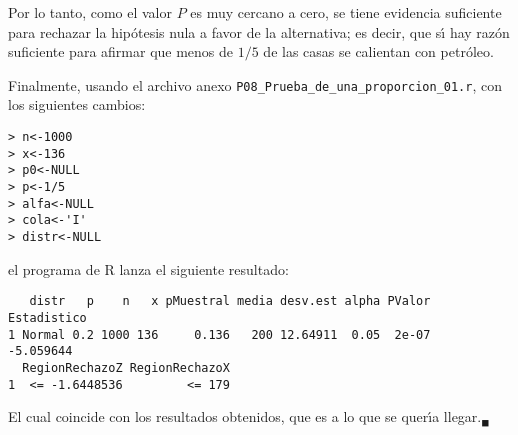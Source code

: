 \begin{solucion}
 \begin{conclusion}
  Por lo tanto, como el valor $P$ es muy cercano a cero, se tiene evidencia
  suficiente para rechazar la hip\'otesis nula a favor de la alternativa;
  es decir, que s\'{\i} hay raz\'on suficiente para afirmar que menos de $1/5$
  de las casas se calientan con petr\'oleo.
 \end{conclusion}
 Finalmente, usando el archivo anexo \texttt{P08\_Prueba\_de\_una\_proporcion\_01.r},
 con los siguientes cambios:
 \begin{verbatim}
> n<-1000
> x<-136
> p0<-NULL
> p<-1/5
> alfa<-NULL
> cola<-'I'
> distr<-NULL
 \end{verbatim}
 \vspace{-0.5cm}
 el programa de R lanza el siguiente resultado:
 \begin{verbatim}
   distr   p    n   x pMuestral media desv.est alpha PValor Estadistico
1 Normal 0.2 1000 136     0.136   200 12.64911  0.05  2e-07   -5.059644
  RegionRechazoZ RegionRechazoX
1  <= -1.6448536         <= 179
 \end{verbatim}
 \vspace{-0.5cm}
 El cual coincide con los resultados obtenidos,
 que es a lo que se quer\'{\i}a llegar.${}_{\blacksquare}$
\end{solucion}
